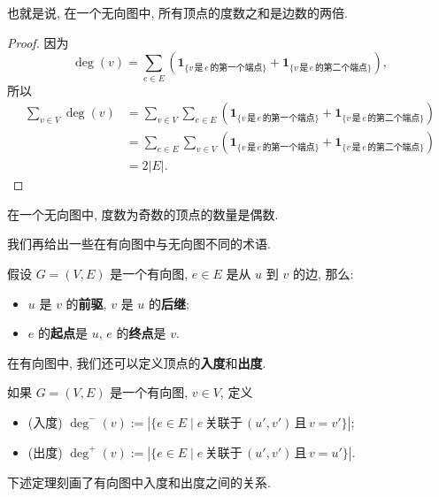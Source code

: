 也就是说, 在一个无向图中, 所有顶点的度数之和是边数的两倍.

\begin{proof}
    因为
    \[\deg(v)=\sum_{e\in E}\left( \mathbf{1}_{\{v\,\text{是}\,e\,\text{的第一个端点}\}} + \mathbf{1}_{\{v\,\text{是}\,e\,\text{的第二个端点}\}} \right),\]
    所以
    \begin{align*}
        \sum_{v\in V}\deg(v)&=\sum_{v\in V}\sum_{e\in E}\left( \mathbf{1}_{\{v\,\text{是}\,e\,\text{的第一个端点}\}} + \mathbf{1}_{\{v\,\text{是}\,e\,\text{的第二个端点}\}} \right)\\
        &=\sum_{e\in E}\sum_{v\in V}\left( \mathbf{1}_{\{v\,\text{是}\,e\,\text{的第一个端点}\}} + \mathbf{1}_{\{v\,\text{是}\,e\,\text{的第二个端点}\}} \right)\\
        &=2|E|.
    \end{align*}
\end{proof}

\begin{corollary}
    在一个无向图中, 度数为奇数的顶点的数量是偶数.
\end{corollary}

我们再给出一些在有向图中与无向图不同的术语.

\begin{definition}[有向边]
    假设 $G=(V,E)$ 是一个有向图, $e\in E$ 是从 $u$ 到 $v$ 的边, 那么: 
    \begin{itemize}
        \item $u$ 是 $v$ 的\textbf{前驱}, $v$ 是 $u$ 的\textbf{后继};
        \item $e$ 的\textbf{起点}是 $u$, $e$ 的\textbf{终点}是 $v$.
    \end{itemize}
\end{definition}

在有向图中, 我们还可以定义顶点的\textbf{入度}和\textbf{出度}.

\begin{definition}[入度和出度]
    如果 $G=(V,E)$ 是一个有向图, $v\in V$, 定义
    \begin{itemize}
        \item (入度) $\deg^-(v):=|\{e\in E\mid e\,\text{关联于}\,(u',v')\,\text{且}\,v=v'\}|$;
        \item (出度) $\deg^+(v):=|\{e\in E\mid e\,\text{关联于}\,(u',v')\,\text{且}\,v=u'\}|$.
    \end{itemize}
\end{definition}

下述定理刻画了有向图中入度和出度之间的关系.

